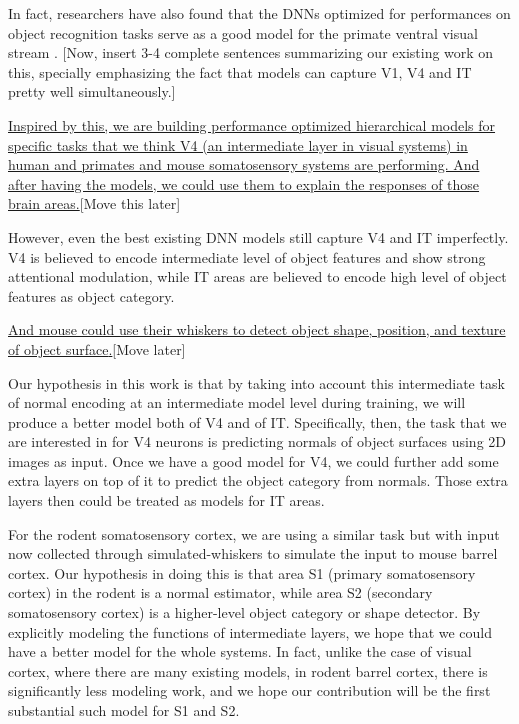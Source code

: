 \documentclass[12pt]{article}
\begin{document}
In fact, researchers have also found that the DNNs optimized for performances on object recognition tasks serve as a good model for the primate ventral visual stream \cite{Yamins2013, Yamins2014, Cadieu2014}. [Now, insert 3-4 complete sentences summarizing our existing work on this, specially emphasizing the fact that models can capture V1, V4 and IT pretty well simultaneously.]

\underline{Inspired by this, we are building performance optimized hierarchical models for specific tasks that we think V4 (an intermediate layer in visual systems) in human and primates and mouse somatosensory systems are performing. And after having the models, we could use them to explain the responses of those brain areas.}[Move this later]

However, even the best existing DNN models still capture V4 and IT imperfectly. V4 is believed to encode intermediate level of object features and show strong attentional modulation\cite{Roe2012}, while IT areas are believed to encode high level of object features as object category. 

\underline{And mouse could use their whiskers to detect object shape, position, and texture of object surface\cite{Boubenec2012,Diamond2008,Arabzadeh2005,OConnor2010}.}[Move later] 

Our hypothesis in this work is that by taking into account this intermediate task of normal encoding at an intermediate model level during training, we will produce a better model both of V4 and of IT. Specifically, then, the task that we are interested in for V4 neurons is predicting normals of object surfaces using 2D images as input. Once we have a good model for V4, we could further add some extra layers on top of it to predict the object category from normals. Those extra layers then could be treated as models for IT areas. 

For the rodent somatosensory cortex, we are using a similar task but with input now collected through simulated-whiskers to simulate the input to mouse barrel cortex. Our hypothesis in doing this is that area S1 (primary somatosensory cortex) in the rodent is a normal estimator, while area S2 (secondary somatosensory cortex) is a higher-level object category or shape detector. By explicitly modeling the functions of intermediate layers, we hope that we could have a better model for the whole systems. In fact, unlike the case of visual cortex, where there are many existing models, in rodent barrel cortex, there is significantly less modeling work, and we hope our contribution will be the first substantial such model for S1 and S2.
\end{document}
